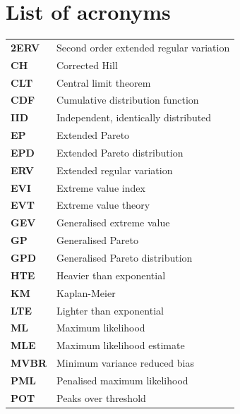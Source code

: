 \chapter*{List of acronyms}
\thispagestyle{empty}
\begin{tabular}{p{3cm}p{8cm}}
\textbf{2ERV} & Second order extended regular variation\\
\textbf{CH} & Corrected Hill \\
\textbf{CLT} & Central limit theorem\\
\textbf{CDF} & Cumulative distribution function\\
\textbf{IID} & Independent, identically distributed\\
\textbf{EP}  & Extended Pareto\\
\textbf{EPD}  & Extended Pareto distribution \\
\textbf{ERV} & Extended regular variation\\
\textbf{EVI} & Extreme value index\\
\textbf{EVT} & Extreme value theory\\
\textbf{GEV} & Generalised extreme value\\
\textbf{GP} & Generalised Pareto\\
\textbf{GPD} & Generalised Pareto distribution\\
\textbf{HTE} & Heavier than exponential\\
\textbf{KM} & Kaplan-Meier\\ 
\textbf{LTE} & Lighter than exponential\\
\textbf{ML} & Maximum likelihood\\
\textbf{MLE} & Maximum likelihood estimate\\
\textbf{MVBR} & Minimum variance reduced bias\\
\textbf{PML} & Penalised maximum likelihood\\
\textbf{POT} & Peaks over threshold\\
\end{tabular}
\clearpage
\cleardoublepage


